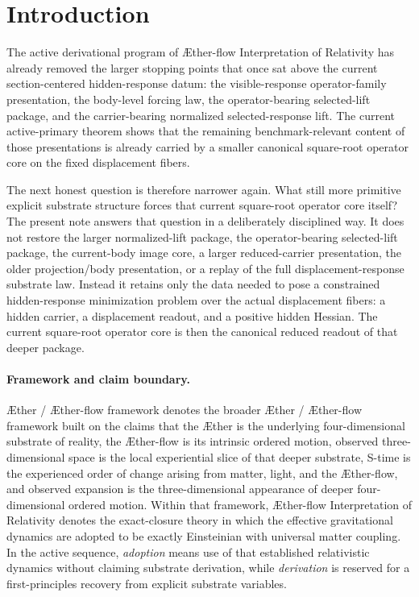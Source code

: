 \documentclass[11pt]{article}
\newcommand{\Aether}{\AE{}ther}
\newcommand{\Aflow}{\AE{}ther-flow}
\newcommand{\TheoryName}{\Aflow{} Interpretation of Relativity}
\newcommand{\TheoryProgram}{\Aether{} / \Aflow{} framework}
\begin{document}
\section{Introduction}

The active derivational program of \TheoryName{} has already removed the larger stopping points that once sat above the current section-centered hidden-response datum: the visible-response operator-family presentation, the body-level forcing law, the operator-bearing selected-lift package, and the carrier-bearing normalized selected-response lift. The current active-primary theorem shows that the remaining benchmark-relevant content of those presentations is already carried by a smaller canonical square-root operator core on the fixed displacement fibers.

The next honest question is therefore narrower again. What still more primitive explicit substrate structure forces that current square-root operator core itself? The present note answers that question in a deliberately disciplined way. It does not restore the larger normalized-lift package, the operator-bearing selected-lift package, the current-body image core, a larger reduced-carrier presentation, the older projection/body presentation, or a replay of the full displacement-response substrate law. Instead it retains only the data needed to pose a constrained hidden-response minimization problem over the actual displacement fibers: a hidden carrier, a displacement readout, and a positive hidden Hessian. The current square-root operator core is then the canonical reduced readout of that deeper package.

\paragraph{Framework and claim boundary.}
\TheoryProgram{} denotes the broader \Aether{} / \Aflow{} framework built on the claims that the \Aether{} is the underlying four-dimensional substrate of reality, the \Aflow{} is its intrinsic ordered motion, observed three-dimensional space is the local experiential slice of that deeper substrate, S-time is the experienced order of change arising from matter, light, and the \Aflow{}, and observed expansion is the three-dimensional appearance of deeper four-dimensional ordered motion. Within that framework, \TheoryName{} denotes the exact-closure theory in which the effective gravitational dynamics are adopted to be exactly Einsteinian with universal matter coupling. In the active sequence, \emph{adoption} means use of that established relativistic dynamics without claiming substrate derivation, while \emph{derivation} is reserved for a first-principles recovery from explicit substrate variables.
\end{document}
